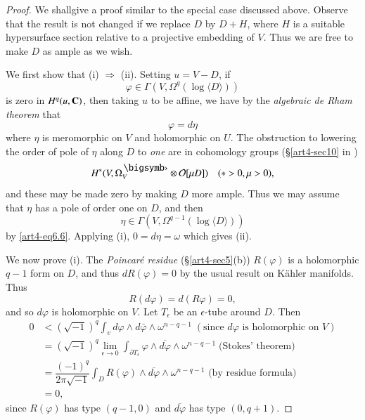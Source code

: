 \begin{proof}
We shall\pageoriginale give a proof similar to the special case discussed above. Observe that the result is not changed if we replace $D$ by $D + H$, where $H$ is a suitable hypersurface section relative to a projective embedding of $V$. Thus we are free to make $D$ as ample as we wish.

We first show that (i) $\Rightarrow$ (ii). Setting $u = V - D$, if 
$$
\varphi \in\Gamma (V, \Omega^q (\log \langle D \rangle))
$$
is zero in $H^q (u, \mathbf{C})$, then taking $u$ to be affine, we have by the \textit{algebraic de Rham theorem} \cite{art4-key26} that
\begin{equation}
\varphi =d \eta \label{art4-eq6.6}
\end{equation}
where $\eta$ is meromorphic on $V$ and holomorphic on $U$. The obstruction to lowering the order of pole of $\eta$ along $D$ to \textit{one} are in cohomology groups (\cf \S \ref{art4-sec10} in \cite{art4-key20})
$$
H^\ast (V, \Omega^\bigdot_V \otimes \cO [\mu D]) \quad (\ast > 0, \mu > 0), 
$$
and these may be made zero by making $D$ more ample. Thus we may assume that $\eta$ has a pole of order one on $D$, and then
$$
\eta \in \Gamma (V, \Omega^{q-1} (\log \langle D \rangle))
$$
by \eqref{art4-eq6.6}. Applying (i), $0 = d \eta = \omega$ which gives (ii).

We now prove (i). The \textit{Poincar\'e residue} (\cf \S \ref{art4-sec5}(b)) $R (\varphi)$ is a holomorphic $q -1$ form on $D$, and thus $d R (\varphi)=0$ by the usual result on K\"ahler manifolds. Thus
$$
R(d \varphi) = d (R \varphi) =0,
$$
and so $d \varphi$ is holomorphic on $V$. Let $T_\epsilon$ be an $\epsilon$-tube around $D$. Then
\begin{align*}
0 & < (\sqrt{-1})^q \int_v d\varphi \wedge d \bar{\varphi} \wedge \omega^{n-q-1} \; (\text{since $d \varphi$ is holomorphic on $V$})\\
& = (\sqrt{-1})^q \lim\limits_{\epsilon \to 0} \int_{\partial T_\epsilon} \varphi \wedge \overline{d \varphi} \wedge \omega^{n-q-1} \; \text{(Stokes' theorem)}\\
& = \dfrac{(-1)^q}{2\pi \sqrt{-1}} \int_D R (\varphi) \wedge \overline{d\varphi} \wedge \omega^{n-q-1} \text{ (by residue formula)}\\
& = 0,
\end{align*}
since $R (\varphi)$ has type $(q-1, 0)$ and $\overline{d \varphi}$ has type $(0, q +1)$.
\end{proof}

